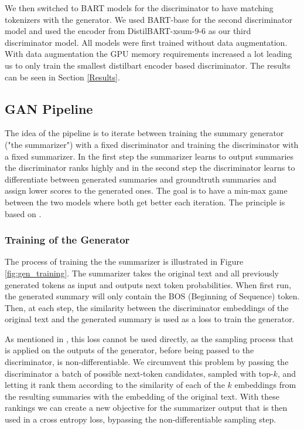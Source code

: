 \documentclass[11pt]{article}
\begin{document}
We then switched to BART models for the discriminator to have matching tokenizers with the generator. We used BART-base \cite{lewis2019bart}  for the second discriminator model and used the encoder from DistilBART-xsum-9-6 \cite{shleifer2020pre} as our third discriminator model. All models were first trained without data augmentation. With data augmentation the GPU memory requirements increased a lot leading us to only train the smallest distilbart encoder based discriminator. The results can be seen in Section \ref{Results}.

\subsection{GAN Pipeline}

The idea of the pipeline is to iterate between training the summary generator ("the summarizer") with a fixed discriminator and training the discriminator with a fixed summarizer. In the first step the summarizer learns to output summaries the discriminator ranks highly and in the second step the discriminator learns to differentiate between generated summaries and groundtruth summaries and assign lower scores to the generated ones. The goal is to have a min-max game between the two models where both get better each iteration.
The principle is based on \cite{goodfellow2014generative}.

\subsubsection{Training of the Generator}

The process of training the the summarizer is illustrated in Figure \ref{fig:gen_training}. The summarizer takes the original text and all previously generated tokens as input and outputs next token probabilities. When first run, the generated summary will only contain the BOS (Beginning of Sequence) token.
Then, at each step, the similarity between the discriminator embeddings of the original text and the generated summary is used as a loss to train the generator. 

As mentioned in , this loss cannot be used directly, as the sampling process that is applied on the outputs of the generator, before being passed to the discriminator, is non-differentiable. We circumvent this problem by passing the discriminator a batch of possible next-token candidates, sampled with top-$k$, and letting it rank them according to the similarity of each of the $k$ embeddings from the resulting summaries with the embedding of the original text. With these rankings we can create a new objective for the summarizer output that is then used in a cross entropy loss, bypassing the non-differentiable sampling step. 
\end{document}
